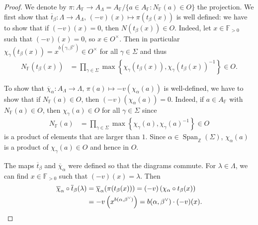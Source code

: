 \documentclass[12pt]{amsart}
\newcommand{\F}{\mathbb{F} }
\newcommand{\Z}{\mathbb{Z} }
\numberwithin{equation}{section}
\theoremstyle{remark} %
\begin{document}
\begin{proof}
	We denote by $\pi \colon A_\F \to A_\Lambda = A_\F / \{ a\in A_\F \colon N_\F(a) \in O \}$ the projection. We first show that $\overline{t}_\beta \colon \Lambda \to A_\Lambda, \, (-v)(x) \mapsto \pi(t_\beta (x))$ is well defined: we have to show that if $(-v)(x) = 0$, then $N(t_\beta(x)) \in O$. Indeed, let $x\in \F_{>0}$ such that $(-v)(x)=0$, so $x \in O^\times$. Then in particular $ \chi_\gamma (t_\beta (x)) = x^{b( \gamma, \beta^\vee )} \in O^\times$ for all $\gamma \in \Sigma$ and thus
	\begin{align*}
		N_\F(t_\beta(x)) & = \prod_{\gamma \in \Sigma} \max \left\{ \chi_\gamma( t_\beta(x)) , \chi_\gamma(t_\beta(x))^{-1} \right\} \in O.
	\end{align*}
	
	To show that $\overline{\chi}_\alpha \colon A_{\Lambda} \to \Lambda, \, \pi(a) \mapsto -v(\chi_\alpha(a))$ is well-defined, we have to show that if $N_\F(a) \in O$, then $(-v)(\chi_\alpha(a)) =0$. Indeed, if $a\in A_\F$ with $N_\F(a) \in O$, then $\chi_\gamma(a) \in O$ for all $\gamma \in \Sigma$ since
	\begin{align*}
		N_\F(a) & = \prod_{\gamma \in \Sigma} \max \left\{ \chi_\gamma( a) , \chi_\gamma(a)^{-1} \right\} \in O
	\end{align*}
	is a product of elements that are larger than $1$. Since $\alpha \in \operatorname{Span}_\Z(\Sigma)$, $\chi_\alpha(a) $ is a product of $\chi_\gamma(a) \in O$ and hence in $O$.
	
	The maps $\overline{t}_\beta$ and $\overline{\chi}_\alpha$ were defined so that the diagrams commute. For $\lambda \in \Lambda$, we can find $x \in \F_{>0}$ such that $(-v)(x)=\lambda $. Then
	\begin{align*}
		\overline{\chi}_\alpha \circ \overline{t}_\beta (\lambda) &= \overline{\chi}_\alpha (\pi(t_\beta(x ) ) )  
		= (-v)\left( \chi_\alpha \circ t_\beta (x) \right) \\
		&= -v\left(x^{b( \alpha, \beta^\vee )} \right)
		= b( \alpha , \beta^\vee) \cdot (-v)(x)  . \qedhere
	\end{align*}
\end{proof}
\end{document}
